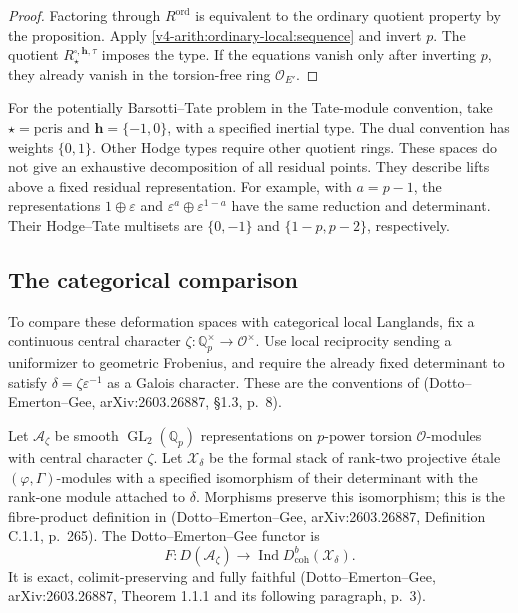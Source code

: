 \begin{proof}
Factoring through $R^{\mathrm{ord}}$ is equivalent to the ordinary
quotient property by the proposition. Apply
\eqref{v4-arith:ordinary-local:sequence} and invert $p$.
The quotient $R^{\square,\mathbf h,\tau}_\star$ imposes the type.
If the equations vanish only after inverting $p$, they already vanish
in the torsion-free ring $\mathcal O_{E'}$.
\end{proof}

For the potentially Barsotti--Tate problem in the Tate-module
convention, take $\star=\mathrm{pcris}$ and
$\mathbf h=\{-1,0\}$, with a specified inertial type.
The dual convention has weights $\{0,1\}$.
Other Hodge types require other quotient rings.
These spaces do not give an exhaustive decomposition of all residual
points. They describe lifts above a fixed residual representation.
For example, with $a=p-1$, the representations
$1\oplus\varepsilon$ and
$\varepsilon^a\oplus\varepsilon^{1-a}$ have the same reduction and
determinant. Their Hodge--Tate multisets are $\{0,-1\}$ and
$\{1-p,p-2\}$, respectively.

\subsection{The categorical comparison}

To compare these deformation spaces with categorical local Langlands,
fix a continuous central character
$\zeta:\mathbb Q_p^\times\to\mathcal O^\times$.
Use local reciprocity sending a uniformizer to geometric Frobenius,
and require the already fixed determinant to satisfy
$\delta=\zeta\varepsilon^{-1}$ as a Galois character.
These are the conventions of (Dotto--Emerton--Gee, arXiv:2603.26887, \S1.3, p.~8).

Let $\mathcal A_\zeta$ be smooth $\operatorname{GL}_2(\mathbb Q_p)$
representations on $p$-power torsion $\mathcal O$-modules with
central character $\zeta$. Let $\mathcal X_\delta$ be the formal
stack of rank-two projective \'etale $(\varphi,\Gamma)$-modules with
a specified isomorphism of their determinant with the rank-one
module attached to $\delta$. Morphisms preserve this isomorphism;
this is the fibre-product definition in
(Dotto--Emerton--Gee, arXiv:2603.26887, Definition C.1.1, p.~265).
The Dotto--Emerton--Gee functor is
\[
 F:D(\mathcal A_\zeta)\longrightarrow
          \operatorname{Ind}D^b_{\mathrm{coh}}(\mathcal X_\delta).
\]
It is exact, colimit-preserving and fully faithful
(Dotto--Emerton--Gee, arXiv:2603.26887, Theorem 1.1.1 and its following paragraph, p.~3).

